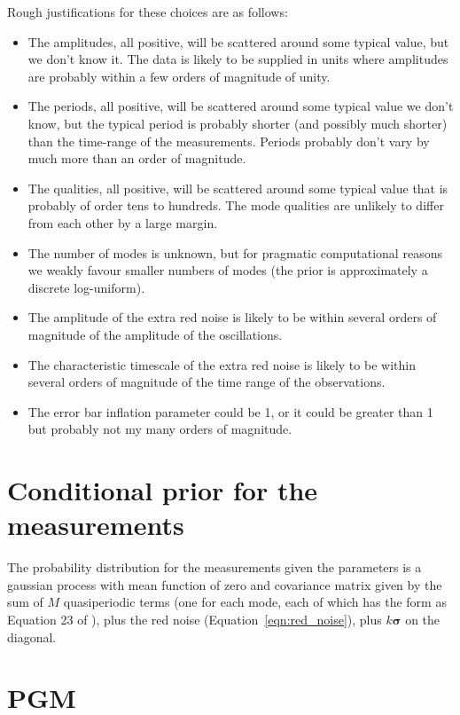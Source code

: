 \documentclass[a4paper, 12pt]{article}
\begin{document}
Rough justifications for these choices are as follows:
\begin{itemize}
    \item The amplitudes, all positive, will be scattered around some typical
          value, but we don't know it. The data is likely to be supplied
          in units where amplitudes are probably
          within a few orders of magnitude of unity.
    \item The periods, all positive, will be scattered around some typical
          value we don't know, but the typical period is probably shorter
          (and possibly much shorter) than the time-range of the measurements.
          Periods probably don't vary by much more than an order of magnitude.
    \item The qualities, all positive, will be scattered around some typical
          value that is probably of order tens to hundreds. The mode qualities
          are unlikely to differ from each other by a large margin.
    \item The number of modes is unknown, but for pragmatic computational
          reasons we weakly favour smaller numbers of modes (the prior
          is approximately a discrete log-uniform).
    \item The amplitude of the extra red noise is likely to be within
          several orders of magnitude of the amplitude of the oscillations.
    \item The characteristic timescale of the extra red noise is likely to
          be within several orders of magnitude of the time range of the
          observations.
    \item The error bar inflation parameter could be 1, or it could be
          greater than 1 but probably not my many orders of magnitude.
\end{itemize}

\section{Conditional prior for the measurements}

The probability distribution for the measurements given the parameters is
a gaussian process with mean function of zero and covariance matrix given
by the sum of $M$ quasiperiodic terms (one for each mode, each of which
has the form as Equation 23 of \citet{celerite}), plus the red noise
(Equation~\ref{eqn:red_noise}), plus $k\boldsymbol{\sigma}$ on the diagonal.

\section{PGM}
\end{document}
